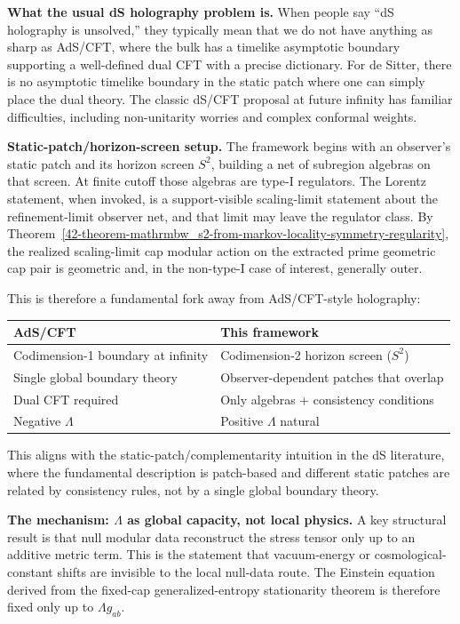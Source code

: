 \textbf{What the usual dS holography problem is.} When people say ``dS holography is unsolved,'' they typically mean that we do not have anything as sharp as AdS/CFT, where the bulk has a timelike asymptotic boundary supporting a well-defined dual CFT with a precise dictionary. For de Sitter, there is no asymptotic timelike boundary in the static patch where one can simply place the dual theory. The classic dS/CFT proposal at future infinity has familiar difficulties, including non-unitarity worries and complex conformal weights.

\textbf{Static-patch/horizon-screen setup.} The framework begins with an observer's static patch and its horizon screen \(S^2\), building a net of subregion algebras on that screen. At finite cutoff those algebras are type-I regulators. The Lorentz statement, when invoked, is a support-visible scaling-limit statement about the refinement-limit observer net, and that limit may leave the regulator class. By Theorem~\ref{42-theorem-mathrmbw_s2-from-markov-locality-symmetry-regularity}, the realized scaling-limit cap modular action on the extracted prime geometric cap pair is geometric and, in the non-type-I case of interest, generally outer.

This is therefore a fundamental fork away from AdS/CFT-style holography:

{\def\LTcaptype{none}
\begin{longtable}[]{@{}>{\raggedright\arraybackslash}p{}>{\raggedright\arraybackslash}p{}@{}}
\toprule\noalign{}
AdS/CFT & This framework \\
\midrule\noalign{}
\endhead
\bottomrule\noalign{}
\endlastfoot
Codimension-1 boundary at infinity & Codimension-2 horizon screen (\(S^2\)) \\
Single global boundary theory & Observer-dependent patches that overlap \\
Dual CFT required & Only algebras + consistency conditions \\
Negative \(\Lambda\) & Positive \(\Lambda\) natural \\
\end{longtable}
}

This aligns with the static-patch/complementarity intuition in the dS literature, where the fundamental description is patch-based and different static patches are related by consistency rules, not by a single global boundary theory.

\textbf{The mechanism: \(\Lambda\) as global capacity, not local physics.} A key structural result is that null modular data reconstruct the stress tensor only up to an additive metric term. This is the statement that vacuum-energy or cosmological-constant shifts are invisible to the local null-data route. The Einstein equation derived from the fixed-cap generalized-entropy stationarity theorem is therefore fixed only up to \(\Lambda g_{ab}\).


